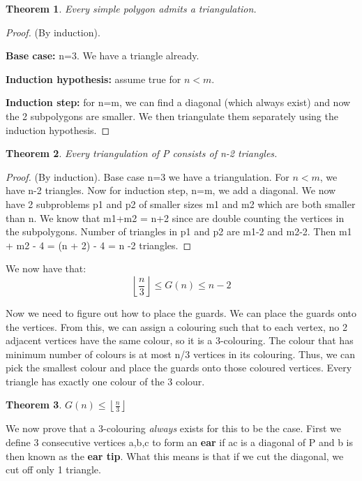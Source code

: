 \documentclass[11pt, oneside]{article}
\newtheorem{theorem}{Theorem}
\theoremstyle{definition}
\begin{document}
\begin{theorem}
  Every simple polygon admits a triangulation.
\end{theorem}
\begin{proof}
  (By induction).

  \textbf{Base case:} n=3. We have a triangle already.

  \textbf{Induction hypothesis:} assume true for $n<m$.

  \textbf{Induction step:} for n=m, we can find a diagonal (which always exist) and now the 2 subpolygons are smaller. We then triangulate them separately using the induction hypothesis.
\end{proof}

\begin{theorem}
  Every triangulation of P consists of n-2 triangles.
\end{theorem}
\begin{proof}
  (By induction). Base case n=3 we have a triangulation. For $n < m$, we have n-2 triangles. Now for induction step, n=m, we add a diagonal. We now have 2 subproblems p1 and p2 of smaller sizes m1 and m2 which are both smaller than n. We know that m1+m2 = n+2 since are double counting the vertices in the subpolygons. Number of triangles in p1 and p2 are m1-2 and m2-2. Then m1 + m2 - 4 = (n + 2) - 4 = n -2 triangles.
\end{proof}

We now have that:
$$
\left \lfloor{\frac{n}{3}} \right \rfloor \leq G(n) \leq n-2
$$

Now we need to figure out how to place the guards. We can place the guards onto the vertices. From this, we can assign a colouring such that to each vertex, no 2 adjacent vertices have the same colour, so it is a 3-colouring. The colour that has minimum number of colours is at most n/3 vertices in its colouring. Thus, we can pick the smallest colour and place the guards onto those coloured vertices. Every triangle has exactly one colour of the 3 colour.

\begin{theorem}
  $G(n) \leq \left \lfloor{\frac{n}{3}} \right \rfloor$
\end{theorem}

We now prove that a 3-colouring \textit{always} exists for this to be the case. First we define 3 consecutive vertices a,b,c to form an \textbf{ear} if ac is a diagonal of P and b is then known as the \textbf{ear tip}. What this means is that if we cut the diagonal, we cut off only 1 triangle.
\end{document}
